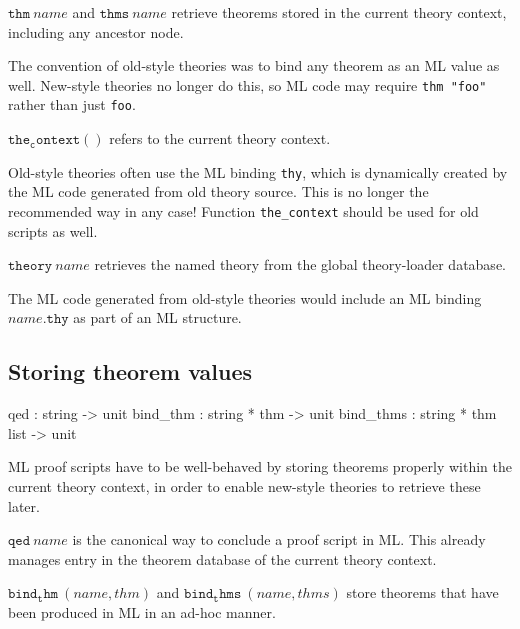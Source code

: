 \begin{descr}
\item [$\mathtt{thm}~name$ and $\mathtt{thms}~name$] retrieve theorems stored
  in the current theory context, including any ancestor node.
  
  The convention of old-style theories was to bind any theorem as an ML value
  as well.  New-style theories no longer do this, so ML code may require
  \texttt{thm~"foo"} rather than just \texttt{foo}.
  
\item [$\mathtt{the_context()}$] refers to the current theory context.
  
  Old-style theories often use the ML binding \texttt{thy}, which is
  dynamically created by the ML code generated from old theory source.  This
  is no longer the recommended way in any case!  Function \texttt{the_context}
  should be used for old scripts as well.
  
\item [$\mathtt{theory}~name$] retrieves the named theory from the global
  theory-loader database.
  
  The ML code generated from old-style theories would include an ML binding
  $name\mathtt{.thy}$ as part of an ML structure.
\end{descr}


\subsection{Storing theorem values}

\begin{ttbox}
qed        : string -> unit
bind_thm   : string * thm -> unit
bind_thms  : string * thm list -> unit
\end{ttbox}

ML proof scripts have to be well-behaved by storing theorems properly within
the current theory context, in order to enable new-style theories to retrieve
these later.

\begin{descr}
  
\item [$\mathtt{qed}~name$] is the canonical way to conclude a proof script in
  ML.  This already manages entry in the theorem database of the current
  theory context.
  
\item [$\mathtt{bind_thm}~(name, thm)$ and $\mathtt{bind_thms}~(name, thms)$]
  store theorems that have been produced in ML in an ad-hoc manner.

\end{descr}

